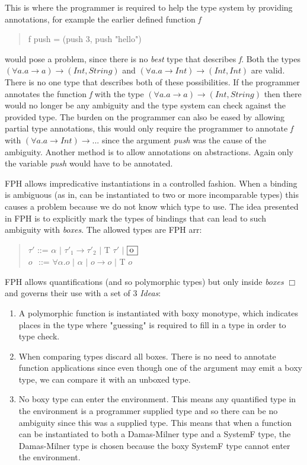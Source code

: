This is where the programmer is required to help the type system by providing annotations, for example the earlier defined function \emph{f}
\begin{quotation}
f push = (push 3, push "hello")
\end{quotation}
would pose a problem, since there is no \emph{best} type that describes \emph{f}. Both the types $(\forall a. a \rightarrow a) \rightarrow (Int, String)$ and $(\forall a. a \rightarrow Int) \rightarrow (Int, Int)$ are valid. There is no one type that describes both of these possibilities.
If the programmer annotates the function \emph{f} with the type $(\forall a. a \rightarrow a) \rightarrow (Int, String)$ then there would no longer be any ambiguity and the type system can check against the provided type.
The burden on the programmer can also be eased by allowing partial type annotations, this would only require the programmer to annotate \emph{f} with $(\forall a. a \rightarrow Int) \rightarrow ...$ since the argument \emph{push} was the cause of the ambiguity. Another method is to allow annotations on abstractions. Again only the variable \emph{push} would have to be annotated.

FPH allows impredicative instantiations in a controlled fashion. When a binding is ambiguous (as in, can be instantiated to two or more incomparable types) this causes a problem because we do not know which type to use. The idea presented in FPH is to explicitly mark the types of bindings that can lead to such ambiguity with \textit{boxes}. The allowed types are FPH arr:

\begin{quotation}
$\tau'$ ::= $\alpha$ $|$  $\tau'_1 \rightarrow \tau'_2$ $|$ T $\tau'$ $|$ $\framebox[0.45cm][l]{o}$ \\
\indent $o$ $\hspace{1pt}$ ::= $\forall \alpha.o$ $|$ $\alpha$ $|$ $o \rightarrow o$ $|$ T $o$
\end{quotation}

FPH allows quantifications (and so polymorphic types) but only inside \emph{boxes} $\Box$ and governs their use with a set of 3 \textit{Ideas}\cite{FPH}:

\begin{enumerate}
\item A polymorphic function is instantiated with boxy monotype, which indicates places in the type where "guessing" is required to fill in a type in order to type check.
\item When comparing types discard all boxes. There is no need to annotate function applications since even though one of the argument may emit a boxy type, we can compare it with an unboxed type.
\item No boxy type can enter the environment. This means any quantified type in the environment is a programmer supplied type and so there can be no ambiguity since this was a supplied type. This means that when a function can be instantiated to both a Damas-Milner type and a SystemF type, the Damas-Milner type is chosen because the boxy SystemF type cannot enter the environment.
\end{enumerate}

